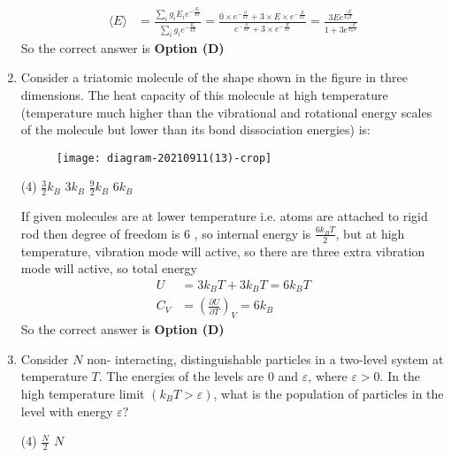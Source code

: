 \begin{enumerate}
\begin{tasks}
	\end{tasks}
	\begin{answer}
		\begin{align*}
		\langle E\rangle&=\frac{\sum_{i} g_{i} E_{i} e^{-\frac{E_{i}}{k T}}}{\sum_{i} g_{i} e^{-\frac{E_{i}}{k T}}}=\frac{0 \times e^{-\frac{0}{k T}}+3 \times E \times e^{-\frac{E}{k T}}}{e^{-\frac{0}{k T}}+3 \times e^{-\frac{E}{k T}}}=\frac{3 E e^{\frac{-E}{k_{B} T}}}{1+3 e^{\frac{-E}{k_{B} T}}}
		\end{align*}
		So the correct answer is \textbf{Option (D)}
	\end{answer}	
	\item Consider a triatomic molecule of the shape shown in the figure in three dimensions. The heat capacity of this molecule at high temperature (temperature much higher than the vibrational and rotational energy scales of the molecule but lower than its bond dissociation energies) is:
	{}
	\begin{figure}[H]
		\centering
		\texttt{[image: diagram-20210911(13)-crop]}
	\end{figure}
	\begin{tasks}(4)
		\task[\textbf{A.}] $\frac{3}{2} k_{B}$
		\task[\textbf{B.}] $3 k_{B}$
		\task[\textbf{C.}] $\frac{9}{2} k_{B}$
		\task[\textbf{D.}] $6 k_{B}$
	\end{tasks}
	\begin{answer}
		If given molecules are at lower temperature i.e. atoms are attached to rigid rod then degree of freedom is 6 , so internal energy is $\frac{6 k_{B} T}{2}$, but at high temperature, vibration mode will active, so there are three extra vibration mode will active, so total energy
		\begin{align*}
		U&=3 k_{B} T+3 k_{B} T=6 k_{B} T\\
		C_{V}&=\left(\frac{\partial U}{\partial T}\right)_{V}=6 k_{B}
		\end{align*}
		So the correct answer is \textbf{Option (D)}
	\end{answer}	
	\item Consider $N$ non- interacting, distinguishable particles in a two-level system at temperature $T$. The energies of the levels are 0 and $\varepsilon$, where $\varepsilon>0$. In the high temperature limit $\left(k_{B} T>\varepsilon\right)$, what is the population of particles in the level with energy $\varepsilon ?$
	{}
	\begin{tasks}(4)
		\task[\textbf{A.}] $\frac{N}{2}$
		\task[\textbf{B.}] $N$

\end{tasks}
\end{enumerate}
